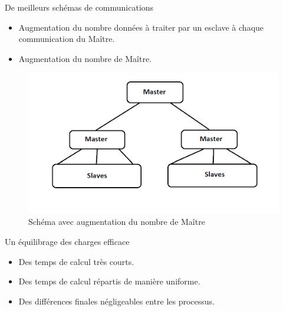 \begin{frame}
\begin{block}{De meilleurs schémas de communications}
\begin{itemize}
\item Augmentation du nombre données à traiter par un esclave à chaque communication du Maître.\vspace{1em}
\item Augmentation du nombre de Maître.
\end{itemize}
\end{block}
\end{frame}

\begin{frame}
\begin{figure}[!ht]	
		\begin{center}\includegraphics[scale=0.55]{Masters2.png}\end{center}
		\caption{Schéma avec augmentation du nombre de Maître}
		\label{fg:fig12}
	\end{figure}
\end{frame}

\begin{frame}
\begin{block}{Un équilibrage des charges efficace}
\begin{itemize}
\item Des temps de calcul très courts.\vspace{1.5em}
\item Des temps de calcul répartis de manière uniforme. \vspace{1.5em}
\item Des différences finales négligeables entre les processus.\\
\end{itemize}
\end{block}

\end{frame}

